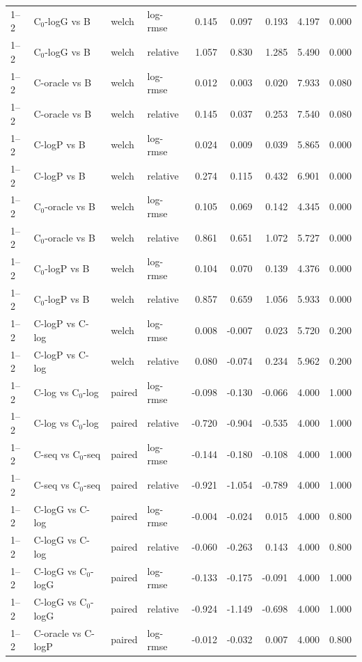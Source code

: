 \begin{longtable}{llllrrrrr}
1–2 & C$_0$-logG vs B & welch & log-rmse & 0.145 & 0.097 & 0.193 & 4.197 & 0.000 \\
1–2 & C$_0$-logG vs B & welch & relative & 1.057 & 0.830 & 1.285 & 5.490 & 0.000 \\
1–2 & C-oracle vs B & welch & log-rmse & 0.012 & 0.003 & 0.020 & 7.933 & 0.080 \\
1–2 & C-oracle vs B & welch & relative & 0.145 & 0.037 & 0.253 & 7.540 & 0.080 \\
1–2 & C-logP vs B & welch & log-rmse & 0.024 & 0.009 & 0.039 & 5.865 & 0.000 \\
1–2 & C-logP vs B & welch & relative & 0.274 & 0.115 & 0.432 & 6.901 & 0.000 \\
1–2 & C$_0$-oracle vs B & welch & log-rmse & 0.105 & 0.069 & 0.142 & 4.345 & 0.000 \\
1–2 & C$_0$-oracle vs B & welch & relative & 0.861 & 0.651 & 1.072 & 5.727 & 0.000 \\
1–2 & C$_0$-logP vs B & welch & log-rmse & 0.104 & 0.070 & 0.139 & 4.376 & 0.000 \\
1–2 & C$_0$-logP vs B & welch & relative & 0.857 & 0.659 & 1.056 & 5.933 & 0.000 \\
1–2 & C-logP vs C-log & welch & log-rmse & 0.008 & -0.007 & 0.023 & 5.720 & 0.200 \\
1–2 & C-logP vs C-log & welch & relative & 0.080 & -0.074 & 0.234 & 5.962 & 0.200 \\
1–2 & C-log vs C$_0$-log & paired & log-rmse & -0.098 & -0.130 & -0.066 & 4.000 & 1.000 \\
1–2 & C-log vs C$_0$-log & paired & relative & -0.720 & -0.904 & -0.535 & 4.000 & 1.000 \\
1–2 & C-seq vs C$_0$-seq & paired & log-rmse & -0.144 & -0.180 & -0.108 & 4.000 & 1.000 \\
1–2 & C-seq vs C$_0$-seq & paired & relative & -0.921 & -1.054 & -0.789 & 4.000 & 1.000 \\
1–2 & C-logG vs C-log & paired & log-rmse & -0.004 & -0.024 & 0.015 & 4.000 & 0.800 \\
1–2 & C-logG vs C-log & paired & relative & -0.060 & -0.263 & 0.143 & 4.000 & 0.800 \\
1–2 & C-logG vs C$_0$-logG & paired & log-rmse & -0.133 & -0.175 & -0.091 & 4.000 & 1.000 \\
1–2 & C-logG vs C$_0$-logG & paired & relative & -0.924 & -1.149 & -0.698 & 4.000 & 1.000 \\
1–2 & C-oracle vs C-logP & paired & log-rmse & -0.012 & -0.032 & 0.007 & 4.000 & 0.800 \\

\end{longtable}

